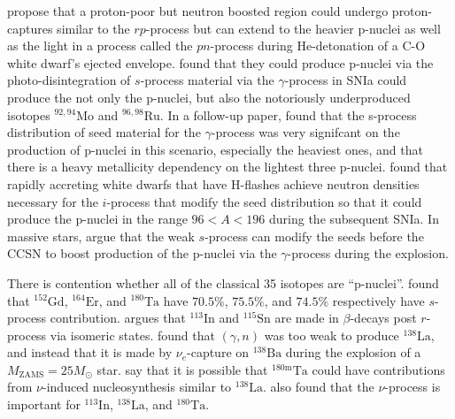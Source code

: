 \cite{gorielyHedetonationSubChandrasekharCO2002} propose that a proton-poor but neutron boosted region could undergo proton-captures similar to the $rp$-process but can extend to the heavier p-nuclei as well as the light in a process called the $pn$-process during He-detonation of a C-O white dwarf's ejected envelope.
\cite{travaglioTypeIaSupernovae2011} found that they could produce p-nuclei via the photo-disintegration of $s$-process material via the $\gamma$-process in SNIa could produce the not only the p-nuclei, but also the notoriously underproduced isotopes $^{92,94}\mathrm{Mo}$ and $^{96,98}\mathrm{Ru}$. 
In a follow-up paper, \cite{travaglioTestingRoleSNe2015} found that the s-process distribution of seed material for the $\gamma$-process was very signifcant on the production of p-nuclei in this scenario, especially the heaviest ones, and that there is a heavy metallicity dependency on the lightest three p-nuclei.
\cite{battinoHeavyElementsNucleosynthesis2020} found that rapidly accreting white dwarfs that have H-flashes achieve neutron densities necessary for the $i$-process that modify the seed distribution so that it could produce the p-nuclei in the range $96 < A < 196$ during the subsequent SNIa.
In massive stars, \cite{pignatariProductionProtonrichIsotopes2016} argue that the weak $s$-process can modify the seeds before the CCSN to boost production of the p-nuclei via the $\gamma$-process during the explosion.

There is contention whether all of the classical 35 isotopes are ``p-nuclei''.
\cite{bisterzoSprocessLowmetallicityStars2011} found that $^{152}\mathrm{Gd}$, $^{164}\mathrm{Er}$, and $^{180}\mathrm{Ta}$ have $70.5\%$, $75.5\%$, and $74.5\%$ respectively have $s$-process contribution.
\cite{dillmannPProcessSimulationsModified2008} argues that $^{113}\mathrm{In}$ and $^{115}\mathrm{Sn}$ are made in $\beta$-decays post $r$-process via isomeric states.
\cite{gorielyPuzzleSynthesisRare2001} found that $(\gamma,n)$ was too weak to produce $^{138}\mathrm{La}$, and instead that it is made by $\nu_e$-capture on $^{138}\mathrm{Ba}$ during the explosion of a $M_{\mathrm{ZAMS}}=25M_\odot$ star.
\cite{arnouldPprocessStellarNucleosynthesis2003} say that it is possible that $^{180\mathrm{m}}\mathrm{Ta}$ could have contributions from $\nu$-induced nucleosynthesis similar to $^{138}\mathrm{La}$.
\cite{sieverdingNProcessLightImproved2018} also found that the $\nu$-process is important for $^{113}\mathrm{In}$, $^{138}\mathrm{La}$, and $^{180}\mathrm{Ta}$.

